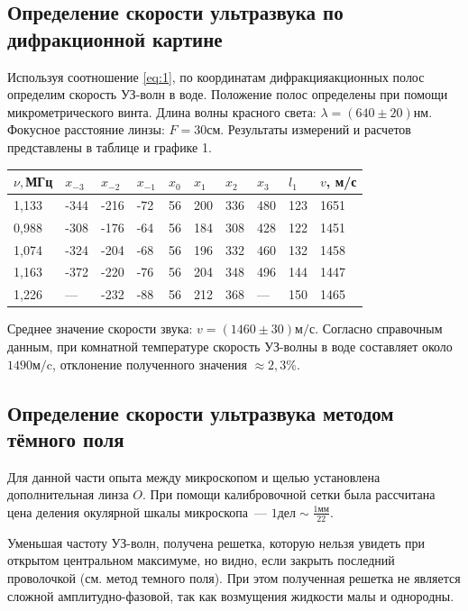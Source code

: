 \subsection{Определение скорости ультразвука по дифракционной картине}
Используя соотношение \ref{eq:1}, по координатам дифракцияакционных полос определим скорость УЗ-волн в воде. Положение полос определены при помощи микрометрического винта. Длина волны красного света: $\lambda = (640 \pm 20)$нм. Фокусное расстояние линзы: $F = 30$см. Результаты измерений и расчетов представлены в таблице и графике 1.

\begin{table}[!ht]
    \centering %
    \begin{tabular}{|l|l|l|l|l|l|l|l|l|l|}
    \hline
        $\nu, $МГц & $x_{-3}$ & $x_{-2}$ & $x_{-1}$ & $x_0$ & $x_1$ & $x_2$ & $x_3$ & $l_1$ & $v$, м/с \\ \hline
        1,133 & -344 & -216 & -72 & 56 & 200 & 336 & 480 & 123 & 1651 \\ \hline
        0,988 & -308 & -176 & -64 & 56 & 184 & 308 & 428 & 122 & 1451 \\ \hline
        1,074 & -324 & -204 & -68 & 56 & 196 & 332 & 460 & 132 & 1458 \\ \hline
        1,163 & -372 & -220 & -76 & 56 & 204 & 348 & 496 & 144 & 1447 \\ \hline
        1,226 & — & -232 & -88 & 56 & 212 & 368 & — & 150 & 1465 \\ \hline
    \end{tabular}
\end{table}

Среднее значение скорости звука: $v = (1460 \pm 30) \text{м/с}$. Согласно справочным данным, при комнатной температуре скорость УЗ-волны в воде составляет около $1490 \text{м/c}$, отклонение полученного значения $\approx 2,3\%$.

\subsection{Определение скорости ультразвука методом тёмного поля}
Для данной части опыта между микроскопом и щелью установлена дополнительная линза $O$. При помощи калибровочной сетки была рассчитана цена деления окулярной шкалы микроскопа~--- 
$1 \text{дел} \sim \frac {1\text{мм}}{22}$.

Уменьшая частоту УЗ-волн, получена решетка, которую нельзя увидеть при открытом центральном максимуме, но видно, если закрыть последний проволочкой (см. метод темного поля). При этом полученная решетка не является сложной амплитудно-фазовой, так как возмущения жидкости малы и однородны.

